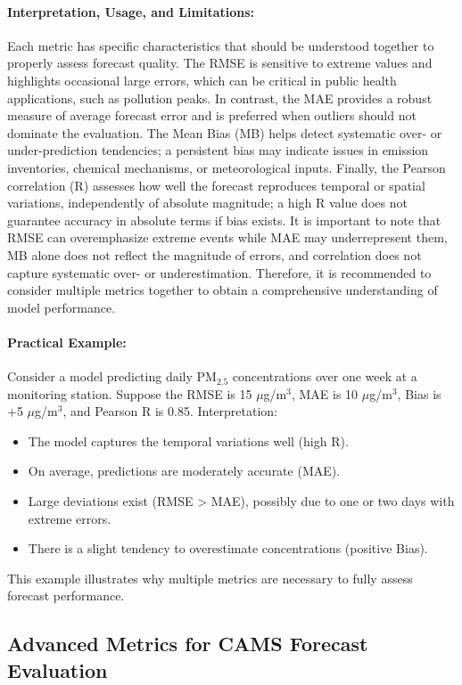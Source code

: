 \paragraph{Interpretation, Usage, and Limitations:}
Each metric has specific characteristics that should be understood together to properly assess forecast quality. The RMSE is sensitive to extreme values and highlights occasional large errors, which can be critical in public health applications, such as pollution peaks. In contrast, the MAE provides a robust measure of average forecast error and is preferred when outliers should not dominate the evaluation. The Mean Bias (MB) helps detect systematic over- or under-prediction tendencies; a persistent bias may indicate issues in emission inventories, chemical mechanisms, or meteorological inputs. Finally, the Pearson correlation (R) assesses how well the forecast reproduces temporal or spatial variations, independently of absolute magnitude; a high R value does not guarantee accuracy in absolute terms if bias exists. It is important to note that RMSE can overemphasize extreme events while MAE may underrepresent them, MB alone does not reflect the magnitude of errors, and correlation does not capture systematic over- or underestimation. Therefore, it is recommended to consider multiple metrics together to obtain a comprehensive understanding of model performance.

\paragraph{Practical Example:}
Consider a model predicting daily PM$_{2.5}$ concentrations over one week at a monitoring station. Suppose the RMSE is 15 $\mu$g/m$^3$, MAE is 10 $\mu$g/m$^3$, Bias is +5 $\mu$g/m$^3$, and Pearson R is 0.85. Interpretation:
\begin{itemize}
	\item The model captures the temporal variations well (high R).
	\item On average, predictions are moderately accurate (MAE).
	\item Large deviations exist (RMSE > MAE), possibly due to one or two days with extreme errors.
	\item There is a slight tendency to overestimate concentrations (positive Bias).
\end{itemize}
This example illustrates why multiple metrics are necessary to fully assess forecast performance.


\subsection{Advanced Metrics for CAMS Forecast Evaluation}

